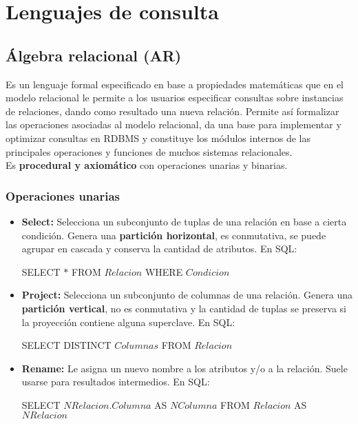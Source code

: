\section*{Lenguajes de consulta}
\subsection*{Álgebra relacional (AR)}
Es un lenguaje formal especificado en base a propiedades matemáticas que en el modelo relacional le permite a los usuarios especificar consultas sobre instancias de relaciones, dando como resultado una nueva relación. Permite así formalizar las operaciones asociadas al modelo relacional, da una base para implementar y optimizar consultas en RDBMS y constituye los módulos internos de las principales operaciones y funciones de muchos sistemas relacionales. \\
Es \textbf{procedural y axiomático} con operaciones unarias y binarias.

\subsubsection*{Operaciones unarias}
\begin{itemize}
    \item \textbf{Select:} Selecciona un subconjunto de tuplas de una relación en base a cierta condición. Genera una \textbf{partición horizontal}, es conmutativa, se puede agrupar en cascada y conserva la cantidad de atributos. En SQL:
    \begin{SQL}
        SELECT $*$ FROM $Relacion$ WHERE $Condicion$
    \end{SQL}
    \item \textbf{Project:} Selecciona un subconjunto de columnas de una relación. Genera una \textbf{partición vertical}, no es conmutativa y la cantidad de tuplas se preserva si la proyección contiene alguna superclave. En SQL:
    \begin{SQL}
        SELECT DISTINCT $Columnas$ FROM $Relacion$
    \end{SQL}
    \item \textbf{Rename:} Le asigna un nuevo nombre a los atributos y/o a la relación. Suele usarse para resultados intermedios. En SQL:
    \begin{SQL}
        SELECT $NRelacion.Columna$ AS $NColumna$ FROM $Relacion$ AS $NRelacion$
    \end{SQL}
\end{itemize}


